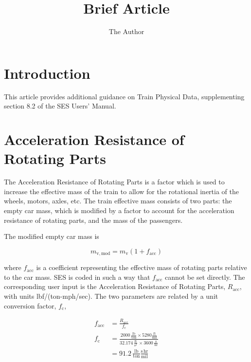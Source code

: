 \documentclass[11pt]{article} %
\title{Brief Article}
\author{The Author}
\begin{document}

\section{Introduction}

This article provides additional guidance on Train Physical Data, supplementing section 8.2 of the SES Users' Manual.

\section{Acceleration Resistance of Rotating Parts}

The Acceleration Resistance of Rotating Parts is a factor which is used to increase the effective mass of the train to allow for the rotational inertia of the wheels, motors, axles, etc. 
The train effective mass consists of two parts: the empty car mass, which is modified by a factor to account for the acceleration resistance of rotating parts, and the mass of the passengers. 

The modified empty car mass is

\begin{equation}
m_\mathrm{v,mod} = m_\mathrm{v} \left(1 + f_\mathrm{acc}\right)
\label{eqn_effective_mass}
\end{equation}

\noindent where $f_\mathrm{acc}$ is a coefficient representing the effective mass of rotating parts relative to the car mass.
SES is coded in such a way that $f_\mathrm{acc}$ cannot be set directly. 
The corresponding user input is the Acceleration Resistance of Rotating Parts, $R_\mathrm{acc}$, with units lbf/(ton-mph/sec).
The two parameters are related by a unit conversion factor, $f_\mathrm{c}$,

\begin{align} \label{eqn_acc_resistance}
f_\mathrm{acc} &= \frac{R_\mathrm{acc}}{f_\mathrm{c}} \\
f_\mathrm{c} &= \frac{2000 \, \frac{\mathrm{lb} }{\mathrm{ton} } \times 5280 \frac{\mathrm{ft} }{\mathrm{mil} }}{32.174 \, \frac{\mathrm{ft}}{\mathrm s^2} \, \times 3600 \, \frac{\mathrm{s}}{\mathrm{hr}} } \\
 &= 91.2 \, \frac{\mathrm{lb}}{\mathrm{ton} } \frac{\mathrm {s \, hr}}{\mathrm{mil} } \nonumber
\end{align}
\end{document}
